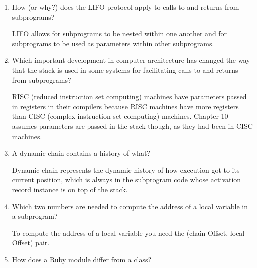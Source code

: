 \begin{enumerate}
\begin{answer}
    \end{answer}


  \item How (or why?) does the LIFO protocol apply to
    calls to and returns from subprograms?

  \begin{answer}

LIFO allows for subprograms to be nested within one another and for subprograms to be used as parameters within other subprograms.

    \end{answer}


  \item Which important development in computer architecture
    has changed the way that the stack is used in some
    systems for facilitating calls to and returns from
    subprograms?

  \begin{answer}

 RISC (reduced instruction set computing) machines have parameters passed in registers in their compilers because RISC machines have more registers than CISC (complex instruction set computing) machines. Chapter 10 assumes parameters are passed in the stack though, as they had been in CISC machines.


    \end{answer}


  \item A dynamic chain contains a history of what?

  \begin{answer}

   Dynamic chain represents the dynamic history of how execution got to its current position, which is always in the subprogram code whose activation record instance is on top of the stack.

    \end{answer}


  \item Which two numbers are needed to compute
    the address of a local variable in a subprogram?

  \begin{answer}

To compute the address of a local variable you need the (chain Offset, local Offset) pair.


    \end{answer}


  \item How does a Ruby module differ from a class?


\end{enumerate}
